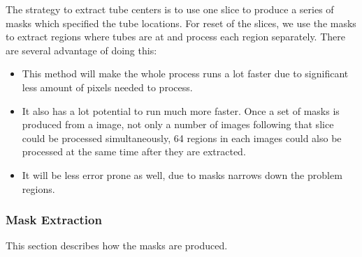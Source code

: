 The strategy to extract tube centers is to use one slice to produce a series of masks which specified the tube
locations. For reset of the slices, we use the masks to extract regions where tubes are at and process each
region separately. There are several advantage of doing this:
\begin{itemize}
\item This method will make the whole process runs a lot faster due to significant less amount of pixels needed
  to process.
\item It also has a lot potential to run much more faster. Once 
  a set of masks is produced from a image, not only a number of images following that slice could be processed
  simultaneously, 64 regions in each images could also be processed at the same time after they are extracted.
\item It will be less error prone as well, due to masks narrows down the problem regions.
\end{itemize}

\subsubsection{Mask Extraction}
This section describes how the masks are produced.

